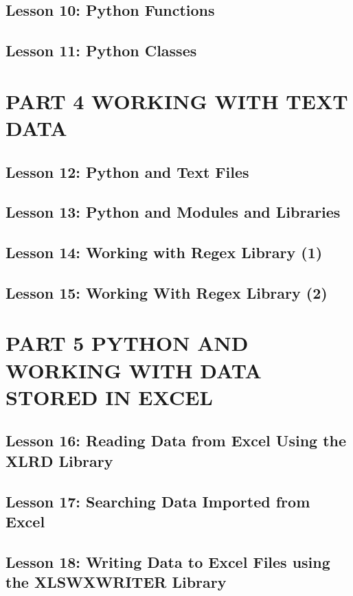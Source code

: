 \documentclass[11pt]{article}
\begin{document}
\subsection{Lesson 10: Python Functions}
\label{sec:org3635dee}
\subsection{Lesson 11: Python Classes}
\label{sec:org5066607}
\section{PART 4 WORKING WITH TEXT DATA}
\label{sec:org07ada2c}
\subsection{Lesson 12: Python and Text Files}
\label{sec:orge9b3af4}
\subsection{Lesson 13: Python and Modules and Libraries}
\label{sec:org7ec9698}
\subsection{Lesson 14: Working with Regex Library (1)}
\label{sec:org81a173d}
\subsection{Lesson 15: Working With Regex Library (2)}
\label{sec:orgd642e3d}
\section{PART 5 PYTHON AND WORKING WITH DATA STORED IN EXCEL}
\label{sec:orgb4159b9}
\subsection{Lesson 16: Reading Data from Excel Using the XLRD Library}
\label{sec:orgf5c2485}
\subsection{Lesson 17: Searching Data Imported from Excel}
\label{sec:org1574498}
\subsection{Lesson 18: Writing Data to Excel Files using the XLSWXWRITER Library}
\label{sec:org956dc24}
\end{document}
